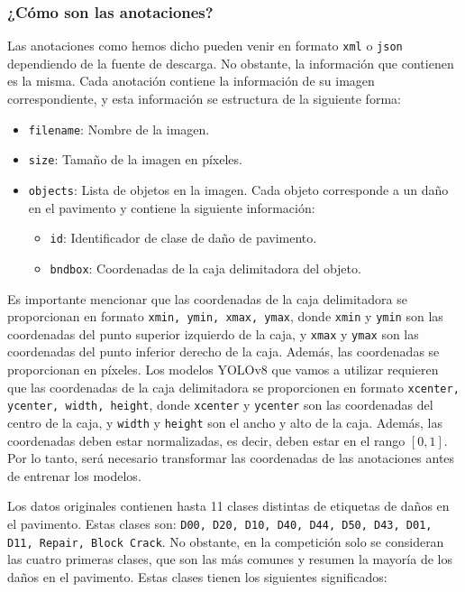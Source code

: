 \subsubsection{¿Cómo son las anotaciones?}
Las anotaciones como hemos dicho pueden venir en formato \texttt{xml} o \texttt{json} dependiendo de la fuente de descarga. No obstante, la información que contienen es la misma. Cada anotación contiene la información de su imagen correspondiente, y esta información se estructura de la siguiente forma:
\begin{itemize}
    \item \texttt{filename}: Nombre de la imagen.
    \item \texttt{size}: Tamaño de la imagen en píxeles.
    \item \texttt{objects}: Lista de objetos en la imagen. Cada objeto corresponde a un daño en el pavimento y contiene la siguiente información:
    \begin{itemize}
        \item \texttt{id}: Identificador de clase de daño de pavimento.
        \item \texttt{bndbox}: Coordenadas de la caja delimitadora del objeto.
    \end{itemize}
\end{itemize}
Es importante mencionar que las coordenadas de la caja delimitadora se proporcionan en formato \texttt{xmin, ymin, xmax, ymax}, donde \texttt{xmin} y \texttt{ymin} son las coordenadas del punto superior izquierdo de la caja, y \texttt{xmax} y \texttt{ymax} son las coordenadas del punto inferior derecho de la caja. Además, las coordenadas se proporcionan en píxeles. Los modelos YOLOv8 que vamos a utilizar requieren que las coordenadas de la caja delimitadora se proporcionen en formato \texttt{xcenter, ycenter, width, height}, donde \texttt{xcenter} y \texttt{ycenter} son las coordenadas del centro de la caja, y \texttt{width} y \texttt{height} son el ancho y alto de la caja. Además, las coordenadas deben estar normalizadas, es decir, deben estar en el rango $[0, 1]$. Por lo tanto, será necesario transformar las coordenadas de las anotaciones antes de entrenar los modelos.

Los datos originales contienen hasta 11 clases distintas de etiquetas de daños en el pavimento. Estas clases son: \texttt{D00, D20, D10, D40, D44, D50, D43, D01, D11, Repair, Block Crack}. No obstante, en la competición solo se consideran las cuatro primeras clases, que son las más comunes y resumen la mayoría de los daños en el pavimento. Estas clases tienen los siguientes significados:

